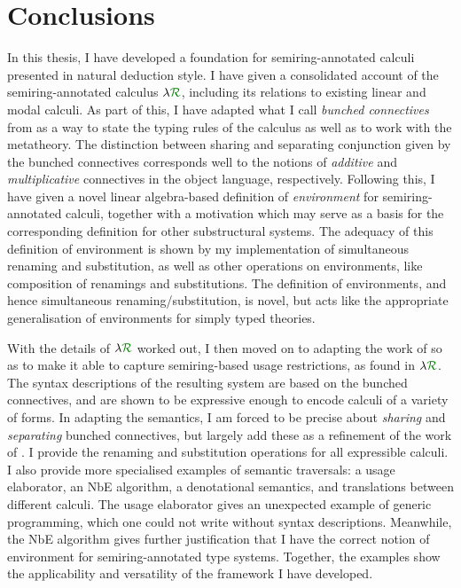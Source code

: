 \chapter{Conclusions}\label{sec:conc}

In this thesis, I have developed a foundation for semiring-annotated calculi
presented in natural deduction style.
I have given a consolidated account of the semiring-annotated calculus $\name$,
including its relations to existing linear and modal calculi.
As part of this, I have adapted what I call \emph{bunched connectives} from
\cite{RPKV20} as a way to state the typing rules of the calculus as well as to
work with the metatheory.
The distinction between sharing and separating conjunction given by the bunched
connectives corresponds well to the notions of \emph{additive} and
\emph{multiplicative} connectives in the object language, respectively.
Following this, I have given a novel linear algebra-based definition of
\emph{environment} for semiring-annotated calculi, together with a motivation
which may serve as a basis for the corresponding definition for other
substructural systems.
The adequacy of this definition of environment is shown by my implementation of
simultaneous renaming and substitution, as well as other operations on
environments, like composition of renamings and substitutions.
The definition of environments, and hence simultaneous renaming/substitution, is
novel, but acts like the appropriate generalisation of environments for simply
typed theories.

With the details of $\name$ worked out, I then moved on to adapting the work of
\citet{AACMM21} so as to make it able to capture semiring-based usage
restrictions, as found in $\name$.
The syntax descriptions of the resulting system are based on the bunched
connectives, and are shown to be expressive enough to encode calculi of a
variety of forms.
In adapting the semantics, I am forced to be precise about \emph{sharing} and
\emph{separating} bunched connectives, but largely add these as a refinement of
the work of \citet{AACMM21}.
I provide the renaming and substitution operations for all expressible calculi.
I also provide more specialised examples of semantic traversals:
a usage elaborator, an NbE algorithm, a denotational semantics, and translations
between different calculi.
The usage elaborator gives an unexpected example of generic programming, which
one could not write without syntax descriptions.
Meanwhile, the NbE algorithm gives further justification that I have the correct
notion of environment for semiring-annotated type systems.
Together, the examples show the applicability and versatility of the framework
I have developed.

